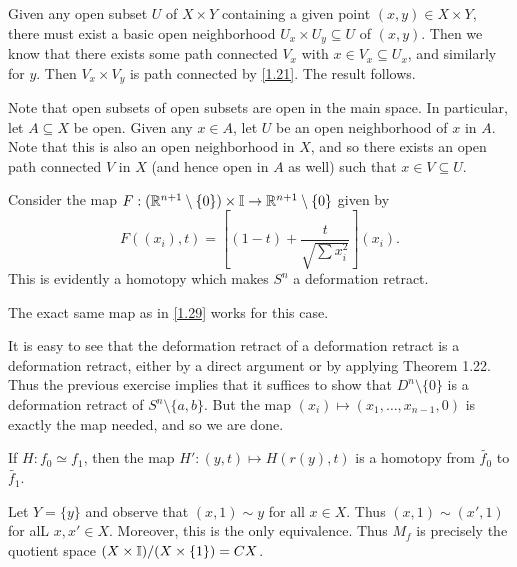 \documentclass[../../solutions.tex]{subfiles}
\begin{document}
\begin{exercise} \leavevmode
Given any open subset $U$ of $X\times Y$ containing a given point $(x,y)\in X\times Y$, there must exist a basic open neighborhood $U_x\times U_y\subseteq U$ of $(x,y)$. Then we know that there exists some path connected $V_x$ with $x\in V_x\subseteq U_x$, and similarly for $y$. Then $V_x\times V_y$ is path connected by \cref{1.21}. The result follows. 
\end{exercise} 

\begin{exercise} \leavevmode
Note that open subsets of open subsets are open in the main space. In particular, let $A\subseteq X$ be open. Given any $x\in A$, let $U$ be an open neighborhood of $x$ in $A$. Note that this is also an open neighborhood in $X$, and so there exists an open path connected $V$ in $X$ (and hence open in $A$ as well) such that $x\in V\subseteq U$. 
\end{exercise} 

\begin{exercise} \leavevmode
Consider the map $F:(\mathbb{R}^{n+1}\setminus\{0\})\times\mathbb I\to\mathbb{R}^{n+1}\setminus\{0\}$ given by \[F((x_i),t)=\left[(1-t)+\frac t{\sqrt{\sum x_i^2}}\right](x_i).\] This is evidently a homotopy which makes $S^n$ a deformation retract. 
\end{exercise} 

\begin{exercise} \leavevmode
The exact same map as in \cref{1.29} works for this case. 
\end{exercise} 

\begin{exercise} \leavevmode
It is easy to see that the deformation retract of a deformation retract is a deformation retract, either by a direct argument or by applying Theorem 1.22. Thus the previous exercise implies that it suffices to show that $D^n\setminus\{0\}$ is a deformation retract of $S^n\setminus\{a,b\}$. But the map $(x_i)\mapsto(x_1,\dots,x_{n-1},0)$ is exactly the map needed, and so we are done. 
\end{exercise} 

\begin{exercise} \leavevmode
If $H:f_0\simeq f_1$, then the map $H':(y,t)\mapsto H(r(y),t)$ is a homotopy from $\tilde{f_0}$ to $\tilde{f_1}$. 
\end{exercise} 

\begin{exercise} \leavevmode
Let $Y=\{y\}$ and observe that $(x,1)\sim y$ for all $x\in X$. Thus $(x,1)\sim(x',1)$ for alL $x,x'\in X$. Moreover, this is the only equivalence. Thus $M_f$ is precisely the quotient space $(X\times\mathbb I)/(X\times\{1\})=CX$.
\end{exercise} 
\end{document}
